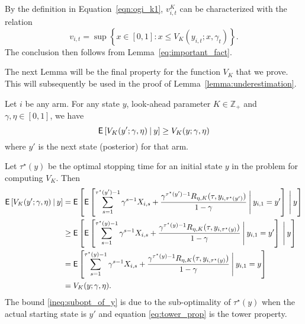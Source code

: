 \begin{myproof}[Proof.]
	By the definition in Equation~\eqref{eqn:ogi_k1}, $v^K_{i,t}$ can be characterized with the relation 
	\begin{equation*}%
	v_{i,t} = \sup\left\{ x \in [0,1] : x \le V_K(y_{i,t}; x, \gamma_t)  \right\}.
	\end{equation*}
	The conclusion then follows from Lemma~\ref{eq:important_fact}.
\end{myproof}
The next Lemma will be the final property for the function $V_K$ that we prove. This will subsequently be used in the proof of Lemma~\ref{lemma:underestimation}.
\begin{lemma} \label{lemma:vk_bound}
	Let $i$ be any arm. For any state $y$, look-ahead parameter $K \in \mathbb{Z}_+$ and $\gamma, \eta \in [0,1]$, we have
	\begin{equation*}
		\Ee{V_K(y'; \gamma, \eta) \given y} \ge V_K(y; \gamma, \eta)
	\end{equation*}
	where $y'$ is the next state (posterior) for that arm.
\end{lemma}
\begin{myproof}[Proof.]
	Let $\tau^\star(y)$ be the optimal stopping time for an initial state $y$ in the problem for computing $V_K$. Then
	\begin{align}
		\Ee{V_K(y'; \gamma, \eta) \given y} & = \Ee{\Ee{\sum_{s=1}^{\tau^\star(y')-1} \gamma^{s-1} X_{i,s} + \frac{\gamma^{\tau^\star(y')-1} R_{\eta, K}(\tau, y_{i,\tau^\star(y')})}{1-\gamma} \given[\Bigg] y_{i,1} = y'} \given[\Bigg] y} \nonumber \\
		& \ge  \Ee{\Ee{\sum_{s=1}^{\tau^\star(y)-1} \gamma^{s-1} X_{i,s} + \frac{\gamma^{\tau^\star(y)-1} R_{\eta, K}(\tau, y_{i,\tau^\star(y)})}{1-\gamma} \given[\Bigg] y_{i,1} = y'} \given[\Bigg] y} \label{ineq:subopt_of_y}\\
		& = \Ee{\sum_{s=1}^{\tau^\star(y)-1} \gamma^{s-1} X_{i,s} + \frac{\gamma^{\tau^\star(y)-1} R_{\eta, K}(\tau, y_{i,\tau^\star(y)})}{1-\gamma} \given[\Bigg] y_{i,1} = y} \label{eq:tower_prop} \\
		& = V_K(y; \gamma, \eta). \nonumber
	\end{align}
	The bound \eqref{ineq:subopt_of_y} is due to the sub-optimality of $\tau^\star(y)$ when the actual starting state is $y'$ and equation \eqref{eq:tower_prop} is the tower property.
\end{myproof}
